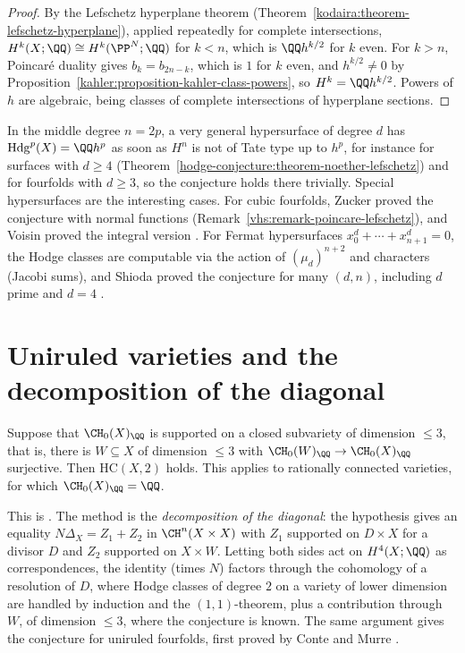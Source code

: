 \begin{proof}
By the Lefschetz hyperplane theorem (Theorem~\ref{kodaira:theorem-lefschetz-hyperplane}), applied repeatedly for complete intersections, $H^k(X; \QQ) \cong H^k(\PP^N; \QQ)$ for $k < n$, which is
$\QQ h^{k/2}$ for $k$ even. For $k > n$, Poincar\'e duality gives $b_k = b_{2n-k}$, which is $1$ for $k$ even, and $h^{k/2} \neq 0$ by Proposition~\ref{kahler:proposition-kahler-class-powers}, so
$H^k = \QQ h^{k/2}$. Powers of $h$ are algebraic, being classes of complete intersections of hyperplane sections.
\end{proof}

\begin{remark}\label{known-cases:remark-middle-degree}
In the middle degree $n = 2p$, a very general hypersurface of degree $d$ has $\mathrm{Hdg}^p(X) = \QQ h^p$ as soon as $H^{n}$ is not of Tate type up to $h^p$, for instance for surfaces with $d \geq 4$
(Theorem~\ref{hodge-conjecture:theorem-noether-lefschetz}) and for fourfolds with $d \geq 3$, so the conjecture holds there trivially. Special hypersurfaces are the interesting cases. For cubic
fourfolds, Zucker proved the conjecture with normal functions (Remark~\ref{vhs:remark-poincare-lefschetz}), and Voisin proved the integral version \cite{voisin-2006}. For
Fermat hypersurfaces $x_0^d + \cdots + x_{n+1}^d = 0$, the Hodge classes are computable via the action of $(\mu_d)^{n+2}$ and characters (Jacobi sums), and Shioda proved the conjecture for many $(d, n)$,
including $d$ prime and $d = 4$ \cite{shioda-1979}.
\end{remark}

\section{Uniruled varieties and the decomposition of the diagonal}\label{known-cases:section-diagonal}

\begin{theorem}\label{known-cases:theorem-bloch-srinivas}
Suppose that $\CH_0(X)_\QQ$ is supported on a closed subvariety of dimension $\leq 3$, that is, there is $W \subseteq X$ of dimension $\leq 3$ with $\CH_0(W)_\QQ \to \CH_0(X)_\QQ$ surjective. Then
$\mathrm{HC}(X, 2)$ holds. This applies to rationally connected varieties, for which $\CH_0(X)_\QQ = \QQ$.
\end{theorem}

This is \cite{bloch-srinivas-1983}. The method is the \emph{decomposition of the diagonal}: the hypothesis gives an equality $N\Delta_X = Z_1 + Z_2$ in $\CH^n(X \times X)$ with $Z_1$ supported on
$D \times X$ for a divisor $D$ and $Z_2$ supported on $X \times W$. Letting both sides act on $H^4(X; \QQ)$ as correspondences, the identity (times $N$) factors through the cohomology of a resolution of
$D$, where Hodge classes of degree $2$ on a variety of lower dimension are handled by induction and the $(1,1)$-theorem, plus a contribution through $W$, of dimension $\leq 3$, where the conjecture is
known. The same argument gives the conjecture for uniruled fourfolds, first proved by Conte and Murre \cite{conte-murre-1978}.

